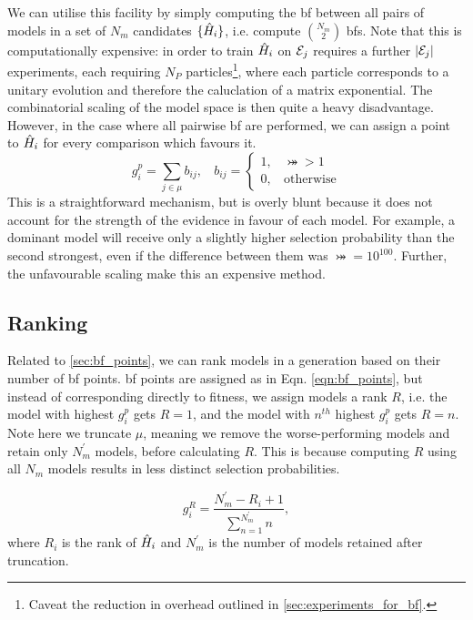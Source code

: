 We can utilise this facility by simply computing the \gls{bf} between all 
    pairs of models in a set of $N_m$ candidates $\{\hat{H}_i\}$, 
    i.e. compute ${N_m \choose 2}$ \gls{bf}s. 
Note that this is computationally expensive: 
    in order to train $\hat{H}_i$ on ${ \mathcal{E} }_j$ requires a further $\left| { \mathcal{E} }_j \right|$ experiments, 
    each requiring $N_P$ particles\footnote{Caveat the reduction in overhead outlined in \cref{sec:experiments_for_bf}.}, 
    where each particle corresponds to a unitary evolution and therefore the caluclation of a matrix exponential. 
The combinatorial scaling of the model space is then quite a heavy disadvantage. 
However, in the case where all pairwise \gls{bf} are performed, 
    we can assign a point to $\hat{H}_i$ for every comparison which favours it. 
\begin{equation}
    \label{eqn:bf_points}
    g_i^p = \sum_{j \in \mu} b_{ij}, \ \ \ \ b_{ij} = 
        \begin{cases}
            1, \ \ \ \ \bij > 1 \\
            0, \ \ \ \ \text{otherwise}
        \end{cases}
\end{equation}
This is a straightforward mechanism, but is overly blunt
    because it does not account for the strength of the evidence
    in favour of each model. 
For example, a dominant model will receive only a slightly higher selection probability 
    than the second strongest, even if the difference between them was $\bij = 10^{100}$. 
Further, the unfavourable scaling make this an expensive method. 

\subsection{Ranking}\label{sec:bf_ranking}
Related to \cref{sec:bf_points}, we can rank models in a generation based on their number of \gls{bf} points.
\gls{bf} points are assigned as in Eqn. \ref{eqn:bf_points}, 
    but instead of corresponding directly to fitness, 
    we assign models a rank $R$, 
    i.e. the model with highest $g_i^p$ gets $R=1$, 
    and the model with $n^{th}$ highest $g_i^p$ gets $R=n$. 
Note here we truncate $\mu$, meaning we remove the worse-performing models and retain only $N_m^{\prime}$ models, 
    before calculating $R$.
This is because computing $R$ using all $N_m$ models results in less distinct selection probabilities. 

\begin{equation}
    \label{eqn:ranking}
    g_i^R = \frac{N_m^{\prime}-R_i+1}{\sum\limits_{n=1}^{N^{\prime}_m} n},
\end{equation}
    where $R_i$ is the rank of $\hat{H}_i$ and $N_m^{\prime}$ is the number of models retained after truncation. 


